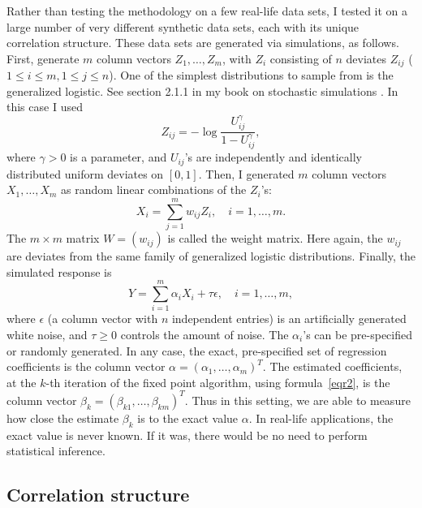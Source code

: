 \documentclass[oneside,10pt]{book}
\begin{document}
Rather than testing the methodology on a few real-life data sets, I tested it on a large number of very different synthetic data sets, each with its unique correlation structure. These data sets are generated via simulations, as follows. First, generate $m$ column vectors $Z_1,\dots,Z_m$, with $Z_i$ consisting of $n$ deviates $Z_{ij}$ ($1\leq i \leq m, 1\leq j \leq n$). One of the simplest distributions to sample from is the \textcolor{index}{generalized logistic}. See section 2.1.1 in my book on 
stochastic simulations \cite{vgsimulnew}. In this case I used
$$Z_{ij}= -\log \frac{U_{ij}^\gamma}{1-U_{ij}^\gamma},$$
where $\gamma>0$ is a parameter, and $U_{ij}$'s are independently and identically distributed uniform deviates on $[0,1]$. 
Then, I generated $m$ column vectors $X_1,\dots,X_m$ as random linear combinations of the $Z_i$'s: 
\begin{equation}
X_i=\sum_{j=1}^m w_{ij} Z_i,\quad i=1,\dots,m.\label{regwij}
\end{equation}
The $m \times m$ matrix $W=(w_{ij})$ is called the weight matrix. Here again, the $w_{ij}$ are deviates from the same family of generalized logistic distributions. Finally, the simulated response is 
$$Y=\sum_{i=1}^m \alpha_i X_i + \tau \epsilon, \quad i=1,\dots,m,$$
where $\epsilon$ (a column vector with $n$ independent entries) is an artificially generated white noise, and $\tau\geq 0$ controls the amount of noise. 
The $\alpha_i$'s can be pre-specified or randomly generated. In any case, the exact, 
pre-specified set of regression coefficients is the column vector $\alpha=(\alpha_1,\dots,\alpha_m)^T$. The estimated coefficients, at the $k$-th iteration of the fixed point algorithm, using formula~\ref{eqr2}, is the column vector $\beta_k=(\beta_{k1},\dots,\beta_{km})^T$. Thus in this setting, we are able to measure how close the estimate $\beta_k$ is to the exact value $\alpha$. In real-life applications, the exact value is never known. If it was, there would be no need to perform statistical inference.

\subsection{Correlation structure}\label{c6correlstr}
\end{document}
